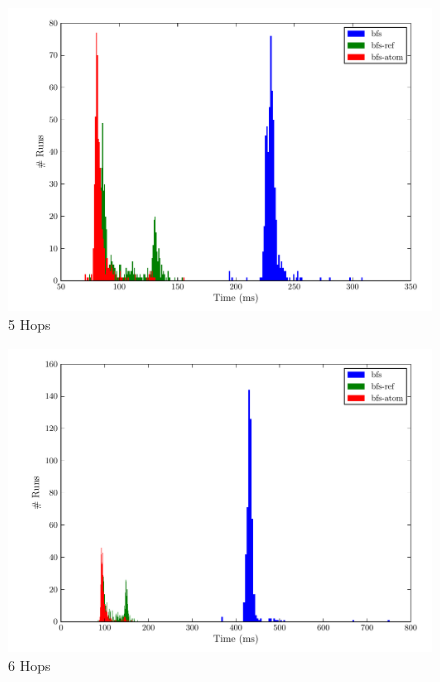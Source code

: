 \documentclass[12pt,letterpaper,oneside]{report}
\theoremstyle{definition}
\begin{document}
		\begin{figure}[!ht]
			\centering
			\includegraphics[scale=0.85]{5_hops}
			\caption{5 Hops}
			\label{fig:perf-5-hops}
		\end{figure}
		
		\begin{figure}[!ht]
			\centering
			\includegraphics[scale=0.85]{6_hops}
			\caption{6 Hops}
			\label{fig:perf-6-hops}
		\end{figure}
		
\end{document}
